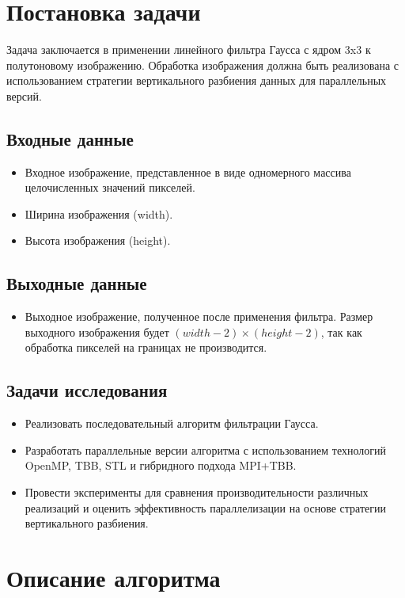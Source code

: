 \documentclass[12pt,a4paper]{extarticle}
\begin{document}
\newpage
\section{Постановка задачи}
Задача заключается в применении линейного фильтра Гаусса с ядром 3x3 к полутоновому изображению. Обработка изображения должна быть реализована с использованием стратегии вертикального разбиения данных для параллельных версий.

\subsection{Входные данные}
\begin{itemize}
    \item Входное изображение, представленное в виде одномерного массива целочисленных значений пикселей.
    \item Ширина изображения (width).
    \item Высота изображения (height).
\end{itemize}

\subsection{Выходные данные}
\begin{itemize}
    \item Выходное изображение, полученное после применения фильтра. Размер выходного изображения будет \((width - 2) \times (height - 2)\), так как обработка пикселей на границах не производится.
\end{itemize}

\subsection{Задачи исследования}
\begin{itemize}
    \item Реализовать последовательный алгоритм фильтрации Гаусса.
    \item Разработать параллельные версии алгоритма с использованием технологий OpenMP, TBB, STL и гибридного подхода MPI+TBB.
    \item Провести эксперименты для сравнения производительности различных реализаций и оценить эффективность параллелизации на основе стратегии вертикального разбиения.
\end{itemize}

\newpage
\section{Описание алгоритма}
\end{document}
